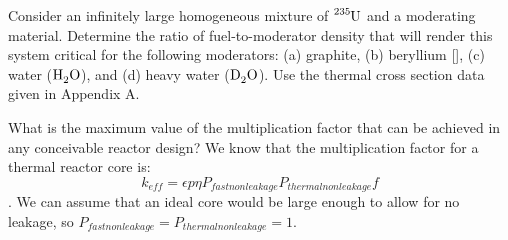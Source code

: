 \documentclass{hw}
\begin{document}
	Consider an infinitely large homogeneous mixture of $ \ce{^{235}U} $ and a moderating material. Determine the ratio of fuel-to-moderator density that will render this system critical for the following moderators: (a) graphite, (b) beryllium [], (c) water ($ \ce{H_{2}O} $), and (d) heavy water ($ \ce{D_{2}O} $). Use the thermal cross section data given in Appendix A.
\solution

	What is the maximum value of the multiplication factor that can be achieved in any conceivable reactor design?
\solution
	We know that the multiplication factor for a thermal reactor core is: \[ k_{eff} = \epsilon p \eta P_{fast non leakage} P_{thermal non leakage} f \]. We can assume that an ideal core would be large enough to allow for no leakage, so $ P_{fast non leakage} = P_{thermal non leakage} = 1 $.
\end{document}
